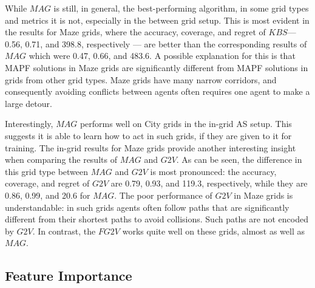 \documentclass{ecai}
\newcommand{\gtv}[1]{\ensuremath{\textit{G2V}}\xspace}
\newcommand{\fgtv}[1]{\ensuremath{\textit{FG2V}}\xspace}
\newcommand{\kaduri}[1]{\ensuremath{\textit{KBS}}\xspace}
\newcommand{\mapfgas}[1]{\ensuremath{\textit{MAG}}\xspace}
\begin{document}
While \mapfgas\ is still, in general, the best-performing algorithm, in some grid types and metrics it is not, especially in the between grid setup. 
This is most evident in the results for Maze grids, where the accuracy, coverage, and regret of \kaduri\ --- 0.56, 0.71, and 398.8, respectively --- are better than the corresponding results of \mapfgas\, which were 0.47, 0.66, and 483.6. 
A possible explanation for this is that MAPF solutions in Maze grids are significantly different from MAPF solutions in grids from other grid types. Maze grids have many narrow corridors, and consequently avoiding conflicts between agents often requires one agent to make a large detour. %

Interestingly, \mapfgas\ performs well on City grids in the in-grid AS setup. This suggests it is able to learn how to act in such grids, if they are given to it for training. 
The in-grid results for Maze grids provide another interesting insight when comparing the results of \mapfgas\ and \gtv\ . As can be seen, the difference in this grid type between \mapfgas\ and \gtv\ is most pronounced: the accuracy, coverage, and regret of \gtv\ are 0.79, 0.93, and 119.3, respectively, while they are 0.86, 0.99, and 20.6 for \mapfgas\ .  
The poor performance of \gtv\ in Maze grids is understandable: in such grids agents often follow paths that are significantly different from their shortest paths to avoid collisions. Such paths are not encoded by \gtv\ . In contrast, the \fgtv\ works quite well on these grids, almost as well as \mapfgas\ . 




\subsection{Feature Importance}
\end{document}
